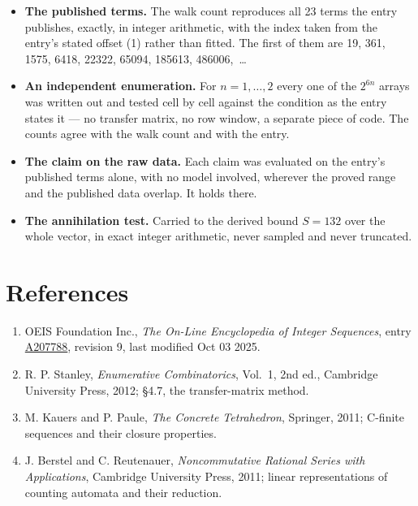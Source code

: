 \documentclass[11pt]{article}
\theoremstyle{definition}
\begin{document}
\begin{itemize}

\item {\bfseries The published terms.} The walk count reproduces all 23 terms the entry publishes, exactly, in integer arithmetic, with the index taken from the entry's stated offset (1) rather than fitted. The first of them are 19, 361, 1575, 6418, 22322, 65094, 185613, 486006,~\dots

\item {\bfseries An independent enumeration.} For $n = 1,\dots,2$ every one of the $2^{6n}$ arrays was written out and tested cell by cell against the condition as the entry states it --- no transfer matrix, no row window, a separate piece of code. The counts agree with the walk count and with the entry.

\item {\bfseries The claim on the raw data.} Each claim was evaluated on the entry's published terms alone, with no model involved, wherever the proved range and the published data overlap. It holds there.

\item {\bfseries The annihilation test.} Carried to the derived bound $S = 132$ over the whole vector, in exact integer arithmetic, never sampled and never truncated.

\end{itemize}

\section{References}

\begin{enumerate}

\item OEIS Foundation Inc., \emph{The On-Line Encyclopedia of Integer Sequences}, entry \href{https://oeis.org/A207788}{A207788}, revision 9, last modified Oct 03 2025.

\item R. P. Stanley, \emph{Enumerative Combinatorics}, Vol.~1, 2nd ed., Cambridge University Press, 2012; \S4.7, the transfer-matrix method.

\item M. Kauers and P. Paule, \emph{The Concrete Tetrahedron}, Springer, 2011; C-finite sequences and their closure properties.

\item J. Berstel and C. Reutenauer, \emph{Noncommutative Rational Series with Applications}, Cambridge University Press, 2011; linear representations of counting automata and their reduction.

\end{enumerate}
\end{document}
